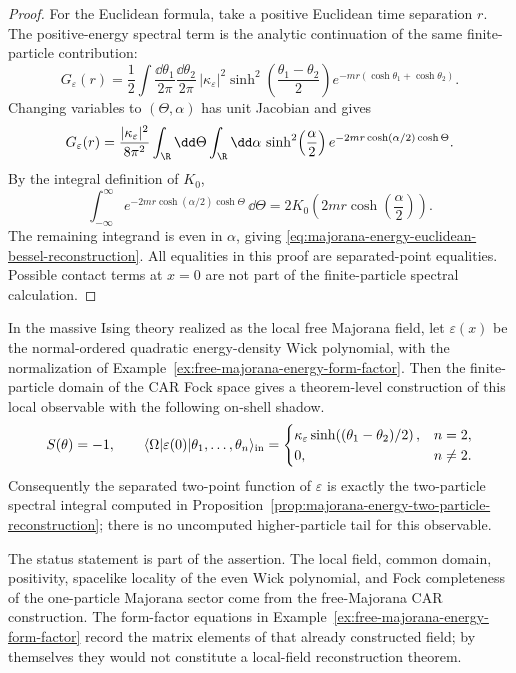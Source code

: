 \begin{proof}
For the Euclidean formula, take a positive Euclidean time separation \(r\).
The positive-energy spectral term is the analytic continuation of the same
finite-particle contribution:
\[
  G_\varepsilon(r)
  =
  \frac12
  \int\frac{\dd\theta_1}{2\pi}\frac{\dd\theta_2}{2\pi}\,
  |\kappa_\varepsilon|^2
  \sinh^2\!\left(\frac{\theta_1-\theta_2}{2}\right)
  e^{-mr(\cosh\theta_1+\cosh\theta_2)} .
\]
Changing variables to \((\Theta,\alpha)\) has unit Jacobian and gives
\[
  G_\varepsilon(r)
  =
  \frac{|\kappa_\varepsilon|^2}{8\pi^2}
  \int_{\R}\dd\Theta\int_{\R}\dd\alpha\,
  \sinh^2\!\left(\frac{\alpha}{2}\right)
  e^{-2mr\cosh(\alpha/2)\cosh\Theta}.
\]
By the integral definition of \(K_0\),
\[
  \int_{-\infty}^{\infty}
  e^{-2mr\cosh(\alpha/2)\cosh\Theta}\,\dd\Theta
  =
  2K_0\!\left(2mr\cosh\!\left(\frac{\alpha}{2}\right)\right).
\]
The remaining integrand is even in \(\alpha\), giving
\eqref{eq:majorana-energy-euclidean-bessel-reconstruction}.
All equalities in this proof are separated-point equalities.  Possible
contact terms at \(x=0\) are not part of the finite-particle spectral
calculation.
\end{proof}

\begin{proposition}
\label{prop:majorana-energy-local-reconstruction-status}
In the massive Ising theory realized as the local free Majorana field, let
\(\varepsilon(x)\) be the normal-ordered quadratic energy-density Wick
polynomial, with the normalization of
Example~\ref{ex:free-majorana-energy-form-factor}.  Then the finite-particle
domain of the CAR Fock space gives a theorem-level construction of this local
observable with the following on-shell shadow.
\[
  S(\theta)=-1,\qquad
  \langle\Omega|\varepsilon(0)
  |\theta_1,\ldots,\theta_n\rangle_{\rm in}
  =
  \begin{cases}
  \kappa_\varepsilon
  \sinh\!\left((\theta_1-\theta_2)/2\right),& n=2,\\
  0,& n\neq2 .
  \end{cases}
\]
Consequently the separated two-point function of \(\varepsilon\) is exactly
the two-particle spectral integral computed in
Proposition~\ref{prop:majorana-energy-two-particle-reconstruction}; there is
no uncomputed higher-particle tail for this observable.

The status statement is part of the assertion.  The local field, common
domain, positivity, spacelike locality of the even Wick polynomial, and
Fock completeness of the one-particle Majorana sector come from the
free-Majorana CAR construction.  The form-factor equations in
Example~\ref{ex:free-majorana-energy-form-factor} record the matrix elements
of that already constructed field; by themselves they would not constitute a
local-field reconstruction theorem.
\end{proposition}

